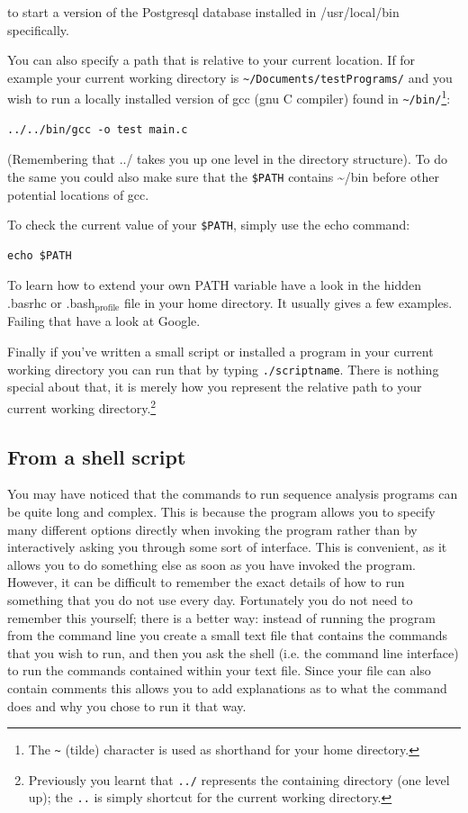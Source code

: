 \documentclass[11pt]{article}
\begin{document}
to start a version of the Postgresql database installed in
/usr/local/bin specifically.

You can also specify a path that is relative to your current location.
If for example your current working directory is
\texttt{\textasciitilde{}/Documents/testPrograms/} and you wish to run a locally installed
version of gcc (gnu C compiler) found in \texttt{\textasciitilde{}/bin/}\footnote{The \texttt{\textasciitilde{}} (tilde) character is used as shorthand for your home
directory.}:

\begin{verbatim}
../../bin/gcc -o test main.c
\end{verbatim}

(Remembering that ../ takes you up one level in the directory
structure). To do the same you could also make sure that the \texttt{\$PATH}
contains \textasciitilde{}/bin before other potential locations of gcc.

To check the current value of your \texttt{\$PATH}, simply use the echo command:

\begin{verbatim}
echo $PATH
\end{verbatim}


To learn how to extend your own PATH variable have a look in the hidden
.basrhc or .bash\(_{\text{profile}}\) file in your home directory. It usually gives a
few examples. Failing that have a look at Google.

Finally if you've written a small script or installed a program in your
current working directory you can run that by typing \texttt{./scriptname}. There
is nothing special about that, it is merely how you represent the
relative path to your current working directory.\footnote{Previously you learnt that \texttt{../} represents the containing directory
(one level up); the \texttt{..} is simply shortcut for the current working directory.}

\subsection{From a shell script}
\label{sec-3-2}
You may have noticed that the commands to run sequence analysis programs can
be quite long and complex. This is because the program allows you to specify
many different options directly when invoking the program rather than by
interactively asking you through some sort of interface. This is convenient,
as it allows you to do something else as soon as you have invoked the
program. However, it can be difficult to remember the exact details of how to
run something that you do not use every day. Fortunately you do not need to
remember this yourself; there is a better way: instead of running the program
from the command line you create a small text file that contains the commands
that you wish to run, and then you ask the shell (i.e. the command line
interface) to run the commands contained within your text file. Since your
file can also contain comments this allows you to add explanations as to what
the command does and why you chose to run it that way.
\end{document}
